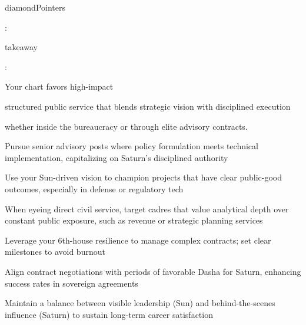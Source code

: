 {\fontsize{9}{13}\selectfont diamondPointers}\par\vspace{1.8mm}

{\fontsize{9}{13}\selectfont :}\par\vspace{1.8mm}

{\fontsize{9}{13}\selectfont takeaway}\par\vspace{1.8mm}

{\fontsize{9}{13}\selectfont :}\par\vspace{1.8mm}

{\fontsize{9}{13}\selectfont Your chart favors high-impact}\par\vspace{1.8mm}

{\fontsize{9}{13}\selectfont structured public service that blends strategic vision with disciplined execution}\par\vspace{1.8mm}

{\fontsize{9}{13}\selectfont whether inside the bureaucracy or through elite advisory contracts.}\par\vspace{1.8mm}

\begin{diamondlist}
  \item {\fontsize{8.5}{12}\selectfont Pursue senior advisory posts where policy formulation meets technical implementation, capitalizing on Saturn's disciplined authority}
  \item {\fontsize{8.5}{12}\selectfont Use your Sun-driven vision to champion projects that have clear public-good outcomes, especially in defense or regulatory tech}
  \item {\fontsize{8.5}{12}\selectfont When eyeing direct civil service, target cadres that value analytical depth over constant public exposure, such as revenue or strategic planning services}
  \item {\fontsize{8.5}{12}\selectfont Leverage your 6th-house resilience to manage complex contracts; set clear milestones to avoid burnout}
  \item {\fontsize{8.5}{12}\selectfont Align contract negotiations with periods of favorable Dasha for Saturn, enhancing success rates in sovereign agreements}
  \item {\fontsize{8.5}{12}\selectfont Maintain a balance between visible leadership (Sun) and behind-the-scenes influence (Saturn) to sustain long-term career satisfaction}
\end{diamondlist}

